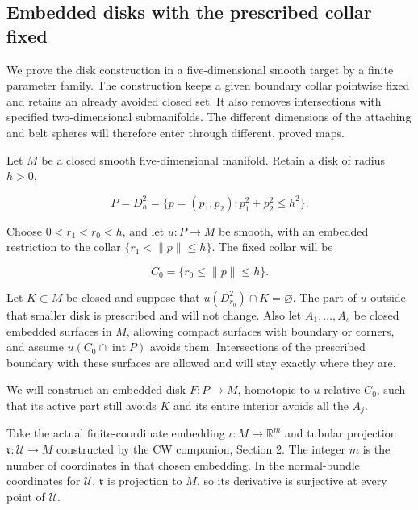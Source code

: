 \subsection{Embedded disks with the prescribed collar fixed}
\label{courseIII:belt-sphere-complements-and-the-whitney-disk:relative-embedded-disks}

\label{courseIII:belt-sphere-complements-and-the-whitney-disk:section-5}\label{courseIII:belt-complement:5}

We prove the disk construction in a five-dimensional smooth target by a finite parameter family. The construction keeps a given boundary collar pointwise fixed and retains an already avoided closed set. It also removes intersections with specified two-dimensional submanifolds. The different dimensions of the attaching and belt spheres will therefore enter through different, proved maps.

Let \(M\) be a closed smooth five-dimensional manifold. Retain a disk of radius \(h>0\),

\begin{equation}
P=D_h^2=\{p=(p_1,p_2):p_1^2+p_2^2\leq h^2\}.
\label{courseIII:belt-sphere-complements-and-the-whitney-disk:eq:5.1}
\end{equation}

Choose \(0<r_1<r_0<h\), and let \(u:P\to M\) be smooth, with an embedded restriction to the collar \(\{r_1<\|p\|\leq h\}\). The fixed collar will be

\begin{equation}
C_0=\{r_0\leq\|p\|\leq h\}.
\label{courseIII:belt-sphere-complements-and-the-whitney-disk:eq:5.2}
\end{equation}

Let \(K\subset M\) be closed and suppose that \(u(D_{r_0}^2)\cap K=\varnothing\). The part of \(u\) outside that smaller disk is prescribed and will not change. Also let \(A_1,\ldots,A_s\) be closed embedded surfaces in \(M\), allowing compact surfaces with boundary or corners, and assume \(u(C_0\cap\operatorname{int}P)\) avoids them. Intersections of the prescribed boundary with these surfaces are allowed and will stay exactly where they are.

We will construct an embedded disk \(F:P\to M\), homotopic to \(u\) relative \(C_0\), such that its active part still avoids \(K\) and its entire interior avoids all the \(A_j\).

Take the actual finite-coordinate embedding \(\iota:M\to\mathbb R^m\) and tubular projection \(\mathfrak r:\mathcal U\to M\) constructed by the CW companion, Section 2. The integer \(m\) is the number of coordinates in that chosen embedding. In the normal-bundle coordinates for \(\mathcal U\), \(\mathfrak r\) is projection to \(M\), so its derivative is surjective at every point of \(\mathcal U\).

